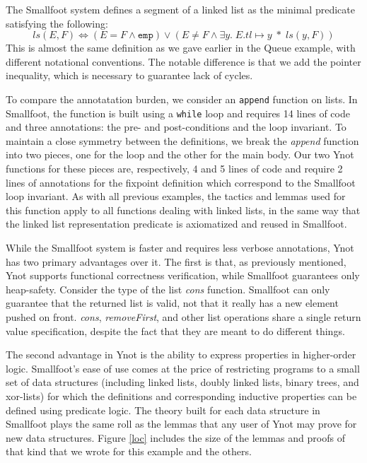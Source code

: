 \documentclass[preprint,nocopyrightspace]{sigplanconf}
\begin{document}
{The Smallfoot system defines a segment of a linked list as the minimal
predicate satisfying the following:
$$
ls(E,F) \Leftrightarrow (E = F \wedge \mathtt{emp}) \vee (E \neq F \wedge \exists y. \; E.tl \mapsto y \; * \; ls(y,F))
$$
This is almost the same definition as we gave earlier in the Queue example, with different notational conventions.  The notable difference is that we add the pointer inequality, which is necessary to guarantee lack of cycles.

To compare the annotatation burden, we consider an {\tt append} function
on lists. In Smallfoot, the function is
built using a {\tt while} loop and requires 14 lines of code and three
annotations: the pre- and post-conditions and the loop invariant. To
maintain a close symmetry between the definitions, we break the {\it
append} function into two pieces, one for the loop and the other for
the main body. Our two Ynot functions for these pieces are,
respectively, 4 and 5 lines of code and require 2 lines of annotations
for the fixpoint definition which correspond to the Smallfoot loop
invariant. As with all previous examples, the tactics and lemmas used
for this function apply to all functions dealing with linked lists, in
the same way that the linked list representation predicate is
axiomatized and reused in Smallfoot.

While the Smallfoot system is faster and requires less verbose
annotations, Ynot has two primary advantages over it. The first is
that, as previously mentioned, Ynot supports functional correctness
verification, while Smallfoot guarantees only heap-safety. Consider
the type of the list {\it cons} function.  Smallfoot can only
guarantee that the returned list is valid, not that it really has a
new element pushed on front.  {\it cons}, {\it removeFirst}, and other
list operations share a single return value specification, despite the
fact that they are meant to do different things.

The second advantage in Ynot is the ability to express properties in
higher-order logic. Smallfoot's ease of use comes at the price of
restricting programs to a small set of data structures (including
linked lists, doubly linked lists, binary trees, and xor-lists) for which the
definitions and corresponding inductive properties can be defined
using predicate logic. The theory built for each data structure in
Smallfoot plays the same roll as the lemmas that any user of
Ynot may prove for new data structures.  Figure \ref{loc} includes the
size of the lemmas and proofs of that kind that we wrote for this
example and the others.

}
\end{document}
